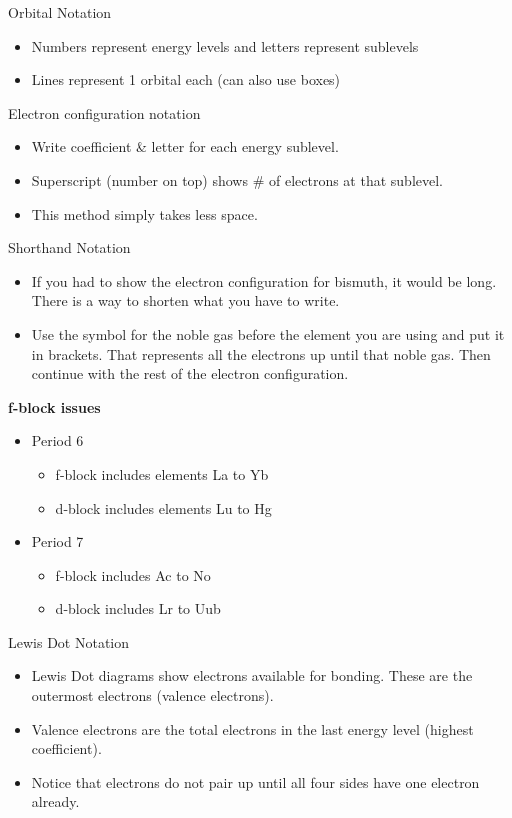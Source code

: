 \documentclass[../hchem.tex]{subfiles}
\begin{document}
Orbital Notation
\begin{itemize}
    \item Numbers represent energy levels and letters represent sublevels 
    \item Lines represent 1 orbital each (can also use boxes)
\end{itemize}

Electron configuration notation 
\begin{itemize}
    \item Write coefficient \& letter for each energy sublevel.
    \item Superscript (number on top) shows \# of electrons at that sublevel.
    \item This method simply takes less space.
\end{itemize}

Shorthand Notation
\begin{itemize}
    \item If you had to show the electron configuration for bismuth, it would be long. There is a way to shorten what you have to write.
    \item Use the symbol for the noble gas before the element you are using and put it in brackets. That represents all the electrons up until that noble gas. Then continue with the rest of the electron configuration.
\end{itemize}

\textbf{f-block issues}
\begin{itemize}
    \item Period 6
    \begin{itemize}
        \item f-block includes elements La to Yb
        \item d-block includes elements Lu to Hg 
    \end{itemize}
    \item Period 7
    \begin{itemize}
        \item f-block includes Ac to No 
        \item d-block includes Lr to Uub 
    \end{itemize}
\end{itemize}

Lewis Dot Notation 
\begin{itemize}
    \item Lewis Dot diagrams show electrons available for bonding. These are the outermost electrons (valence electrons).
    \item Valence electrons are the total electrons in the last energy level (highest coefficient).
    \item Notice that electrons do not pair up until all four sides have one electron already.
\end{itemize}
\end{document}
